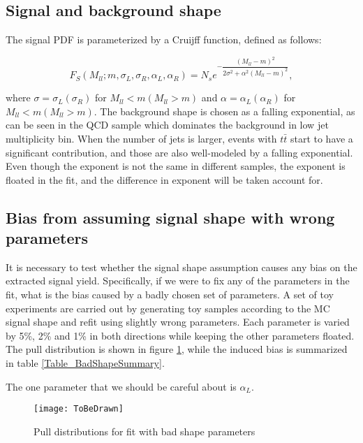\documentclass{cmspaper}
\begin{document}
\subsection{Signal and background shape}

The signal PDF is parameterized by a Cruijff function, defined as follows:

\begin{equation}
F_S(M_{ll}; m, \sigma_L, \sigma_R, \alpha_L, \alpha_R) = N_s e^{-\dfrac{(M_{ll} - m)^2}{2 \sigma^2 + \alpha^2 (M_{ll} - m)^2}},\nonumber
\end{equation}

where $\sigma = \sigma_L (\sigma_R)$ for $M_{ll} < m (M_{ll} > m)$ and $\alpha = \alpha_L (\alpha_R)$ for $M_{ll} < m (M_{ll} > m)$.
The background shape is chosen as a falling exponential, as can be seen in the QCD sample which dominates the background in low
jet multiplicity bin.  When the number of jets is larger, events with $t\bar{t}$ start to have a significant contribution, and those are
also well-modeled by a falling exponential.
Even though the exponent is not the same in different samples, the exponent is floated in the fit, and the difference in exponent will be taken account for.

\subsection{Bias from assuming signal shape with wrong parameters}

It is necessary to test whether the signal shape assumption causes any bias on the extracted signal yield.
Specifically, if we were to fix any of the parameters in the fit, what is the bias caused by a badly chosen set of parameters.
A set of toy experiments are carried out by generating toy samples according to the MC signal shape and refit using slightly wrong parameters.
Each parameter is varied by 5\%, 2\% and 1\% in both directions while keeping the other parameters floated.
The pull distribution is shown in figure \ref{Figure_BadShapePulls}, while the induced bias is summarized in table \ref{Table_BadShapeSummary}.

The one parameter that we should be careful about is $\alpha_L$.

\begin{figure}
   \centering
   \texttt{[image: ToBeDrawn]}
   \caption{Pull distributions for fit with bad shape parameters}
   \label{Figure_BadShapePulls}
\end{figure}
\end{document}
